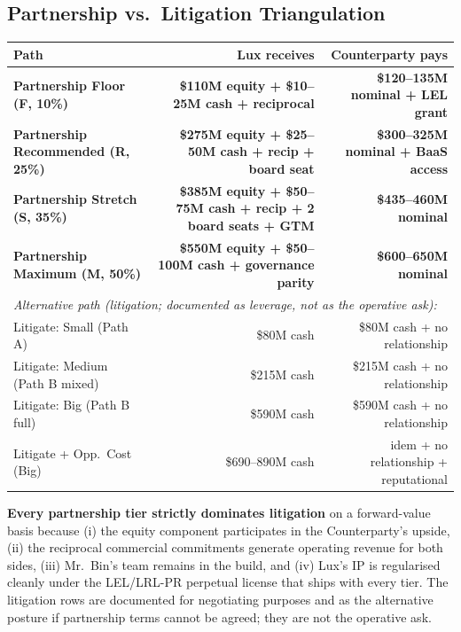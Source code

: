 \documentclass[11pt,letterpaper]{article}
\begin{document}
\subsection*{Partnership vs.\ Litigation Triangulation}

\begin{center}
\begin{small}
\begin{tabular}{lrr}
\toprule
\textbf{Path} & \textbf{Lux receives} & \textbf{Counterparty pays} \\
\midrule
\textbf{Partnership Floor (F, 10\%)}        & \textbf{\$110M equity + \$10--25M cash + reciprocal} & \textbf{\$120--135M nominal + LEL grant} \\
\textbf{Partnership Recommended (R, 25\%)}  & \textbf{\$275M equity + \$25--50M cash + recip + board seat} & \textbf{\$300--325M nominal + BaaS access} \\
\textbf{Partnership Stretch (S, 35\%)}      & \textbf{\$385M equity + \$50--75M cash + recip + 2 board seats + GTM} & \textbf{\$435--460M nominal} \\
\textbf{Partnership Maximum (M, 50\%)}      & \textbf{\$550M equity + \$50--100M cash + governance parity} & \textbf{\$600--650M nominal} \\
\midrule
\multicolumn{3}{l}{\textit{Alternative path (litigation; documented as leverage, not as the operative ask):}} \\
Litigate: Small (Path A)                  & \$80M cash & \$80M cash + no relationship \\
Litigate: Medium (Path B mixed)           & \$215M cash & \$215M cash + no relationship \\
Litigate: Big (Path B full)               & \$590M cash & \$590M cash + no relationship \\
Litigate + Opp.\ Cost (Big)               & \$690--890M cash & idem + no relationship + reputational \\
\bottomrule
\end{tabular}
\end{small}
\end{center}

\textbf{Every partnership tier strictly dominates litigation} on a
forward-value basis because (i) the equity component participates in
the Counterparty's upside, (ii) the reciprocal commercial commitments
generate operating revenue for both sides, (iii) Mr.\ Bin's team
remains in the build, and (iv) Lux's IP is regularised cleanly under
the LEL/LRL-PR perpetual license that ships with every tier. The
litigation rows are documented for negotiating purposes and as the
alternative posture if partnership terms cannot be agreed; they are
not the operative ask.
\end{document}
